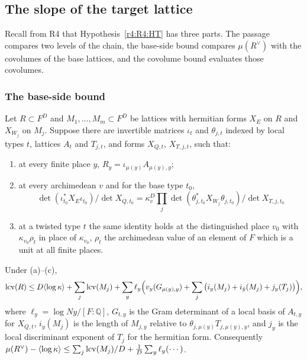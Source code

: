 \subsection{The slope of the target lattice}\label{w3:sec:HT}

Recall from R4 that Hypothesis~\ref{r4:R4:HT} has three parts. The passage compares two levels of the chain, the base-side bound compares $\mu(R^\vee)$ with the covolumes of the base lattices, and the covolume bound evaluates those covolumes.

\subsubsection{The base-side bound}

Let $R\subset F^D$ and $M_1,\dots,M_m\subset F^D$ be lattices with hermitian forms $X_E$ on $R$ and $X_{W_j}$ on $M_j$. Suppose there are invertible matrices $\iota_t$ and $\theta_{j,t}$ indexed by local types $t$, lattices $A_t$ and $T_{j,t}$, and forms $X_{Q,t}$, $X_{T,j,t}$, such that:
\begin{enumerate}
\item[(a)] at every finite place $y$, $R_y=\iota_{\mu(y)}A_{\mu(y),y}$;
\item[(b)] at every archimedean $v$ and for the base type $t_0$,
\[
\det(\iota_{t_0}^*X_E\iota_{t_0})/\det X_{Q,t_0}=\kappa_v^D\prod_j\det(\theta_{j,t_0}^*X_{W_j}\theta_{j,t_0})/\det X_{T,j,t_0}
\]
\item[(c)] at a twisted type $t$ the same identity holds at the distinguished place $v_0$ with $\kappa_{v_0}\rho_t$ in place of $\kappa_{v_0}$, $\rho_t$ the archimedean value of an element of $F$ which is a unit at all finite places.
\end{enumerate}

\begin{proposition}\label{w3:W3:base}
Under (a)--(c),
\[
\operatorname{lcv}(R)\le D\langle\log\kappa\rangle+\sum_j\operatorname{lcv}(M_j)+\sum_y\ell_y\Big(v_y(G_{\mu(y),y})+\sum_j\big(i_y(M_j)+i_{\bar y}(M_j)+j_y(T_j)\big)\Big),
\]
where $\ell_y=\log Ny/[F:\mathbb Q]$, $G_{t,y}$ is the Gram determinant of a local basis of $A_{t,y}$ for $X_{Q,t}$, $i_y(M_j)$ is the length of $M_{j,y}$ relative to $\theta_{j,\mu(y)}T_{j,\mu(y),y}$, and $j_y$ is the local discriminant exponent of $T_j$ for the hermitian form. Consequently $\mu(R^\vee)-\langle\log\kappa\rangle\le\sum_j\operatorname{lcv}(M_j)/D+\frac1D\sum_y\ell_y(\cdots)$.
\end{proposition}

